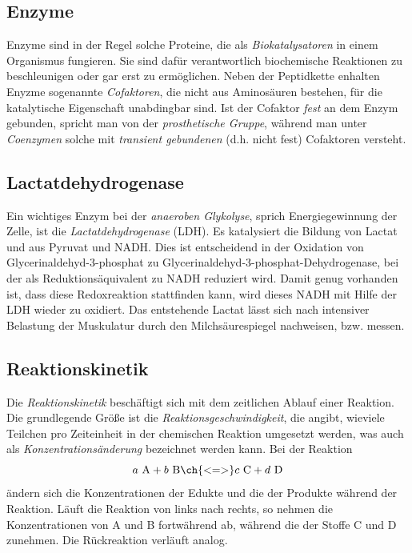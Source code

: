 \documentclass{scrartcl}
\begin{document}
\subsection{Enzyme}
Enzyme sind in der Regel solche Proteine, die als \emph{Biokatalysatoren} in einem Organismus fungieren. Sie sind dafür verantwortlich biochemische Reaktionen zu beschleunigen oder gar erst zu ermöglichen. Neben der Peptidkette enhalten Enyzme sogenannte \emph{Cofaktoren}, die nicht aus Aminosäuren bestehen, für die katalytische Eigenschaft unabdingbar sind. Ist der Cofaktor \emph{fest} an dem Enzym gebunden, spricht man von der \emph{prosthetische Gruppe}, während man unter \emph{Coenzymen} solche mit \emph{transient gebundenen} (d.h. nicht fest) Cofaktoren versteht.
\subsection{Lactatdehydrogenase}
Ein wichtiges Enzym bei der \emph{anaeroben Glykolyse}, sprich Energiegewinnung der Zelle, ist die \emph{Lactatdehydrogenase} (LDH). Es katalysiert die Bildung von Lactat und  aus Pyruvat und NADH. Dies ist entscheidend in der Oxidation von Glycerinaldehyd-3-phosphat zu Glycerinaldehyd-3-phosphat-Dehydrogenase, bei der als Reduktionsäquivalent  zu NADH reduziert wird. Damit genug  vorhanden ist, dass diese Redoxreaktion stattfinden kann, wird dieses NADH mit Hilfe der LDH wieder zu  oxidiert. Das entstehende Lactat lässt sich nach intensiver Belastung der Muskulatur durch den Milchsäurespiegel nachweisen, bzw. messen. 
\subsection{Reaktionskinetik}
Die \emph{Reaktionskinetik} beschäftigt sich mit dem zeitlichen Ablauf einer Reaktion. Die grundlegende Größe ist die \emph{Reaktionsgeschwindigkeit}, die angibt, wieviele Teilchen pro Zeiteinheit in der chemischen Reaktion umgesetzt werden, was auch als \emph{Konzentrationsänderung} bezeichnet werden kann. Bei der Reaktion
\begin{equation}\label{eq:ABCD}
	a\text{ A} + b\text{ B} \ch{<=>} c\text{ C} + d\text{ D}
\end{equation}
ändern sich die Konzentrationen der Edukte und die der Produkte während der Reaktion. Läuft die Reaktion von links nach rechts, so nehmen die Konzentrationen von A und B fortwährend ab, während die der Stoffe C und D zunehmen. Die Rückreaktion verläuft analog.  
\end{document}
